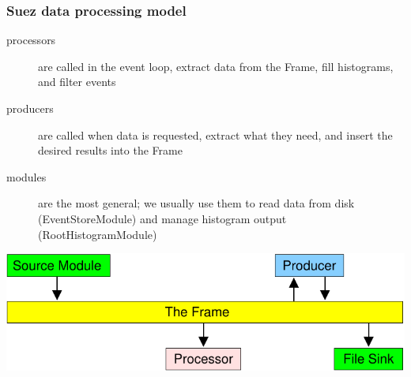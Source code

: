 \documentclass[12pt,compress]{beamer}
\begin{document}
\begin{frame}
\frametitle{Suez data processing model}

\begin{description}
\item[processors] are called in the event loop, extract data from the
  Frame, fill histograms, and filter events
\item[producers] are called when data is requested, extract what they
  need, and insert the desired results into the Frame
\item[modules] are the most general; we usually use them to read data
  from disk (EventStoreModule) and manage histogram output
  (RootHistogramModule)
\end{description}

\begin{center}
\includegraphics[width=0.7\linewidth]{procprod}
\end{center}
\end{frame}
\end{document}
